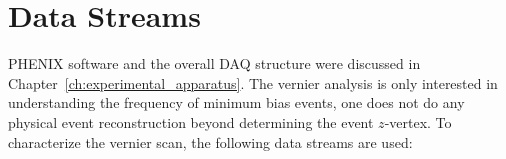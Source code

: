 \begin{table}[ht]
  \caption{
    The variables we use in the vernier analysis. Some variables are extracted
    directly from the data streams (such as the bbc-rate), while others are
    calculated from distributions of variables (such as the beam-width,
    $\sigma_{x,y}$). 
  }
  \label{tab:ana_vars}
\end{table}

\section{Data Streams}
\label{ch:DataStreams}

PHENIX software and the overall DAQ structure were discussed in
Chapter~\ref{ch:experimental_apparatus}. The vernier analysis is only interested
in understanding the frequency of minimum bias events, one does not do any
physical event reconstruction beyond determining the event $z$-vertex. To
characterize the vernier scan, the following data streams are used:


